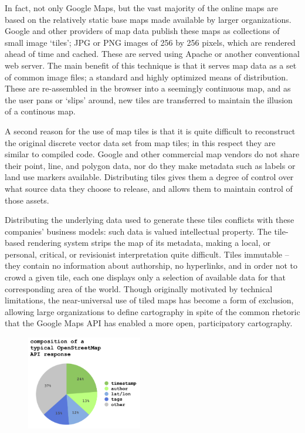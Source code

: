 \documentclass[11pt,oneside,notitlepage]{report}
\begin{document}
In fact, not only Google Maps, but the vast majority of the online maps are based on the relatively static base maps made available by larger organizations. Google and other providers of map data publish these maps as collections of small image `tiles'; JPG or PNG images of 256 by 256 pixels, which are rendered ahead of time and cached. These are served using Apache or another conventional web server. The main benefit of this technique is that it serves map data as a set of common image files; a standard and highly optimized means of distribution. These are re-assembled in the browser into a seemingly continuous map, and as the user pans or `slips' around, new tiles are transferred to maintain the illusion of a continous map.

A second reason for the use of map tiles is that it is quite difficult to reconstruct the original discrete vector data set from map tiles; in this respect they are similar to compiled code. Google and other commercial map vendors do not share their point, line, and polygon data, nor do they make metadata such as labels or land use markers available. Distributing tiles gives them a degree of control over what source data they choose to release, and allows them to maintain control of those assets. 

Distributing the underlying data used to generate these tiles conflicts with these companies' business models: such data is valued intellectual property. The tile-based rendering system strips the map of its metadata, making a local, or personal, critical, or revisionist interpretation quite difficult. Tiles immutable – they contain no information about authorship, no hyperlinks, and in order not to crowd a given tile, each one displays only a selection of available data for that corresponding area of the world. Though originally motivated by technical limitations, the near-universal use of tiled maps has become a form of exclusion, allowing large organizations to define cartography in spite of the common rhetoric that the Google Maps API has enabled a more open, participatory cartography. 

\begin{figure}
	\begin{flushleft}
		\includegraphics[width=0.45\textwidth]{images/osm-composition.png}
	\end{flushleft}
\end{figure}
\end{document}
